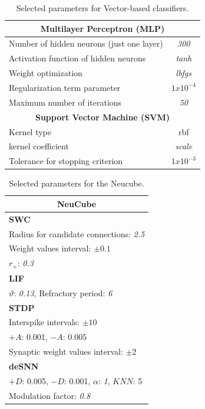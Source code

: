 \begin{table}[h!]
	\caption{Selected parameters for Vector-based classifiers.}
	\centering
	\begin{tabular}{|l|c|}\hline
		\multicolumn{2}{|c|}{\textbf{Multilayer Perceptron (MLP)}}\\\hline
		Number of hidden neurons (just one layer)&\textit{300}\\\hline
		Activation function of hidden neurons&\textit{tanh}\\\hline
		Weight optimization&\textit{lbfgs}\\\hline
		Regularization term parameter&$1x10^{-4}$\\\hline
		Maximum number of iterations&\textit{50}\\\hline
		\multicolumn{2}{|c|}{\textbf{Support Vector Machine (SVM)}}\\\hline
		Kernel type&rbf\\\hline
		kernel coefficient&\textit{scale}\\\hline
		Tolerance for stopping criterion&$1x10^{-3}$\\\hline
	\end{tabular}
	\label{Table: VB_Parameters}
\end{table}

\begin{table}[h!]
	\caption{Selected parameters for the Neucube.}
	\centering
	\begin{threeparttable}
		\begin{tabular}{|l|}\hline
			\multicolumn{1}{|c|}{\textbf{NeuCube}}\\\hline
			\textbf{SWC}\\\hline
			Radius for candidate connections: \textit{2.5}\\
			Weight values interval: $\pm 0.1$\\
			$r_{+}$: \textit{0.3}\\\hline
			\textbf{LIF}\\\hline
			$\vartheta$: \textit{0.13}, Refractory period: \textit{6}\\\hline
			\textbf{STDP}\\\hline
			Interspike intervals: $\pm 10$\\
			$+A$: 0.001, $-A$: 0.005\\
			Synaptic weight values interval: $\pm 2$\\\hline
			\textbf{deSNN}\\\hline
			$+D$: 0.005, $-D$: 0.001, $\alpha$: \textit{1}, $KNN$: 5\\
			Modulation factor: \textit{0.8}\\\hline
		\end{tabular}
	\end{threeparttable}
	\label{Table: NeuCube_Parameters}
\end{table}

